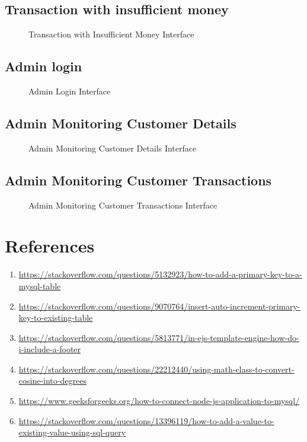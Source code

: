 \documentclass[12pt,a4paper]{report}
\begin{document}
\section{Transaction with insufficient money}
\begin{figure}[h]
    \centering
    \caption{Transaction with Insufficient Money Interface}
\end{figure}

\section{Admin login}
\begin{figure}[h]
    \centering
    \caption{Admin Login Interface}
\end{figure}

\section{Admin Monitoring Customer Details}
\begin{figure}[h]
    \centering
    \caption{Admin Monitoring Customer Details Interface}
\end{figure}

\section{Admin Monitoring Customer Transactions}
\begin{figure}[h]
    \centering
    \caption{Admin Monitoring Customer Transactions Interface}
\end{figure}

\chapter{References}

\begin{enumerate}
    \item \raggedright \url{https://stackoverflow.com/questions/5132923/how-to-add-a-primary-key-to-a-mysql-table}
    \item \raggedright \url{https://stackoverflow.com/questions/9070764/insert-auto-increment-primary-key-to-existing-table}
    \item \raggedright \url{https://stackoverflow.com/questions/5813771/in-ejs-template-engine-how-do-i-include-a-footer}
    \item \raggedright \url{https://stackoverflow.com/questions/22212440/using-math-class-to-convert-cosine-into-degrees}
    \item \raggedright \url{https://www.geeksforgeeks.org/how-to-connect-node-js-application-to-mysql/}
    \item \raggedright \url{https://stackoverflow.com/questions/13396119/how-to-add-a-value-to-existing-value-using-sql-query}
\end{enumerate}
\end{document}
